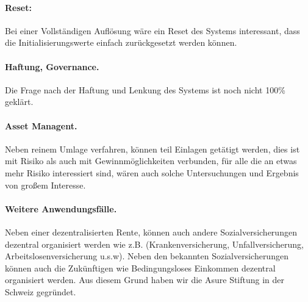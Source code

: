 \paragraph{Reset:} Bei einer Vollständigen Auflösung wäre ein Reset des Systems interessant, dass die Initialisierungswerte einfach zurückgesetzt werden können.

\paragraph{Haftung, Governance.} Die Frage nach der Haftung und Lenkung des Systems ist noch nicht 100\% geklärt.

\paragraph{Asset Managent.} Neben reinem Umlage verfahren, können teil Einlagen getätigt werden, dies ist mit Risiko als auch mit Gewinnmöglichkeiten verbunden, für alle die an etwas mehr Risiko interessiert sind, wären auch solche Untersuchungen und Ergebnis von großem Interesse.

\paragraph{Weitere Anwendungsfälle.} Neben einer dezentralisierten Rente, können auch andere Sozialversicherungen dezentral organisiert werden wie z.B. (Krankenversicherung, Unfallversicherung, Arbeitslosenversicherung u.s.w). Neben den bekannten Sozialversicherungen können auch die Zukünftigen wie Bedingungsloses Einkommen dezentral organisiert werden. Aus diesem Grund haben wir die Asure Stiftung in der Schweiz gegründet.

